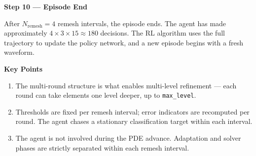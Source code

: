\documentclass[11pt]{article}
\begin{document}
\vspace{0.4cm}

\noindent\textbf{\textcolor{episodecolor}{Step 10 --- Episode End}}

After $N_{\text{remesh}} = 4$ remesh intervals, the episode ends. The agent has made approximately $4 \times 3 \times 15 \approx 180$ decisions. The RL algorithm uses the full trajectory to update the policy network, and a new episode begins with a fresh waveform.

\vspace{0.6cm}

\noindent\textbf{Key Points}

\begin{enumerate}[leftmargin=1.5em, itemsep=4pt]
    \item The multi-round structure is what enables multi-level refinement --- each round can take elements one level deeper, up to \texttt{max\_level}.
    \item Thresholds are fixed per remesh interval; error indicators are recomputed per round. The agent chases a stationary classification target within each interval.
    \item The agent is not involved during the PDE advance. Adaptation and solver phases are strictly separated within each remesh interval.
\end{enumerate}
\end{document}
